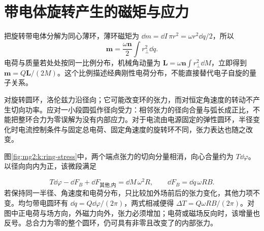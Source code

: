 \section{带电体旋转产生的磁矩与应力}
把旋转带电体分解为同心薄环，薄环磁矩为 $\dd m=\dd I\,\pi r^2=\omega r^2\dd q/2$，所以
\[
\bm m=\frac{\omega\bm n}{2}\int r_\perp^2\dd q.
\]
电荷与质量若处处按同一比例分布，机械角动量为 $\bm L=\omega\bm n\int r_\perp^2\dd M$，立即得到 $\bm m=Q\bm L/(2M)$。这个比例描述经典刚性电荷分布，不能直接替代电子自旋的量子关系。


对旋转圆环，洛伦兹力沿径向；它可能改变环的张力，而对恒定角速度的转动不产生切向功率。应对一小段圆弧作径向受力：相邻张力的径向合量与弧长成正比，不能把整环合力为零误解为没有内部应力。对于电流由电源固定的弹性圆环，半径变化时电流控制条件与固定总电荷、固定角速度的旋转环不同，张力表达也随之改变。

图\ref{fig:mg2:k:ring-stress}中，两个端点张力的切向分量相消，向心合量约为 $T\dd\varphi$。以径向向内为正，该微段满足

\[
 T\dd\varphi-\dd F_B+\dd F_{\text{其他,内}}
 =\dd M\,\omega^2R,\qquad \dd F_B=\dd q\,\omega RB.
\]
若保持同一半径、角速度和电荷分布，只比较加外场前后的张力变化，其他力项不变。均匀带电圆环有 $\dd q=Q\dd\varphi/(2\pi)$，两式相减便得 $\Delta T=Q\omega RB/(2\pi)$。对图中正电荷与场方向，外磁力向外，张力必须增加；电荷或磁场反向时，该增量也反号。总合力为零的整个圆环，仍可具有非零且改变了的内部张力。



